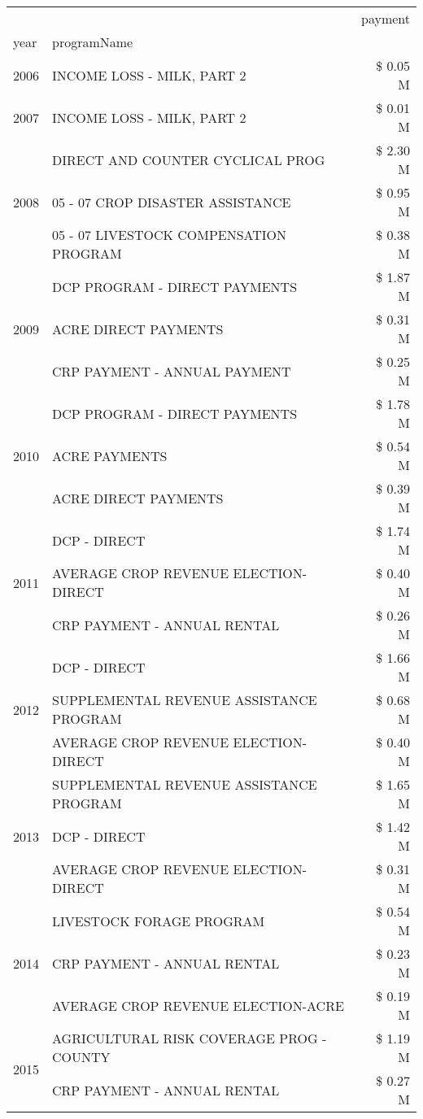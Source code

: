 \begin{tabular}{llr}
\toprule
 &  & payment \\
year & programName &  \\
\midrule
2006 & INCOME LOSS - MILK, PART 2 & \$ 0.05 M \\
\cline{1-3}
2007 & INCOME LOSS - MILK, PART 2 & \$ 0.01 M \\
\cline{1-3}
\multirow[t]{3}{*}{2008} & DIRECT AND COUNTER CYCLICAL PROG & \$ 2.30 M \\
 & 05 - 07 CROP DISASTER ASSISTANCE & \$ 0.95 M \\
 & 05 - 07 LIVESTOCK COMPENSATION PROGRAM & \$ 0.38 M \\
\cline{1-3}
\multirow[t]{3}{*}{2009} & DCP PROGRAM - DIRECT PAYMENTS & \$ 1.87 M \\
 & ACRE DIRECT PAYMENTS & \$ 0.31 M \\
 & CRP PAYMENT - ANNUAL PAYMENT & \$ 0.25 M \\
\cline{1-3}
\multirow[t]{3}{*}{2010} & DCP PROGRAM - DIRECT PAYMENTS & \$ 1.78 M \\
 & ACRE PAYMENTS & \$ 0.54 M \\
 & ACRE DIRECT PAYMENTS & \$ 0.39 M \\
\cline{1-3}
\multirow[t]{3}{*}{2011} & DCP - DIRECT & \$ 1.74 M \\
 & AVERAGE CROP REVENUE ELECTION-DIRECT & \$ 0.40 M \\
 & CRP PAYMENT - ANNUAL RENTAL & \$ 0.26 M \\
\cline{1-3}
\multirow[t]{3}{*}{2012} & DCP - DIRECT & \$ 1.66 M \\
 & SUPPLEMENTAL REVENUE ASSISTANCE PROGRAM & \$ 0.68 M \\
 & AVERAGE CROP REVENUE ELECTION-DIRECT & \$ 0.40 M \\
\cline{1-3}
\multirow[t]{3}{*}{2013} & SUPPLEMENTAL REVENUE ASSISTANCE PROGRAM & \$ 1.65 M \\
 & DCP - DIRECT & \$ 1.42 M \\
 & AVERAGE CROP REVENUE ELECTION-DIRECT & \$ 0.31 M \\
\cline{1-3}
\multirow[t]{3}{*}{2014} & LIVESTOCK FORAGE PROGRAM & \$ 0.54 M \\
 & CRP PAYMENT - ANNUAL RENTAL & \$ 0.23 M \\
 & AVERAGE CROP REVENUE ELECTION-ACRE & \$ 0.19 M \\
\cline{1-3}
\multirow[t]{3}{*}{2015} & AGRICULTURAL RISK COVERAGE PROG - COUNTY & \$ 1.19 M \\
 & CRP PAYMENT - ANNUAL RENTAL & \$ 0.27 M \\

\end{tabular}
